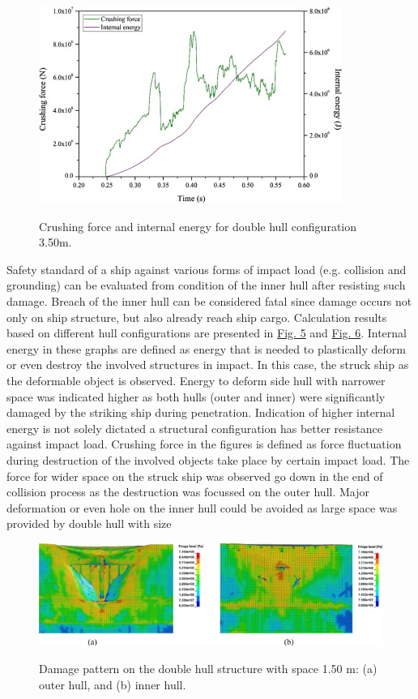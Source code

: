 \documentclass[../Final.tex]{subfiles}
\begin{document}
\begin{figure}[ht]
    \centering
    \includegraphics[width=\columnwidth]{fig6.jpg}
    \label{fig6}
    \caption{Crushing force and internal energy for double hull configuration 3.50m.}
\end{figure}

Safety standard of a ship against various forms of impact load (e.g. collision and grounding) can be evaluated from condition of the inner hull after resisting such damage. 
Breach of the inner hull can be considered fatal since damage occurs not only on ship structure, but also already reach ship cargo. Calculation results based on different hull configurations are presented in \hyperref[fig5]{Fig. 5} and \hyperref[fig6]{Fig. 6}. 
Internal energy in these graphs are defined as energy that is needed to plastically deform or even destroy the involved structures in impact. 
In this case, the struck ship as the deformable object is observed. Energy to deform side hull with narrower space was indicated higher as both hulls (outer and inner) were significantly damaged by the striking ship during penetration. 
Indication of higher internal energy is not solely dictated a structural configuration has better resistance against impact load. 
Crushing force in the figures is defined as force fluctuation during destruction of the involved objects take place by certain impact load. 
The force for wider space on the struck ship was observed go down in the end of collision process as the destruction was focussed on the outer hull. Major deformation or even hole on the inner hull could be 
avoided as large space was provided by double hull with size

\begin{figure}[ht]
    \centering
    \includegraphics[width=\columnwidth]{fig7.jpg}
    \label{fig7}
    \caption{Damage pattern on the double hull structure with space 1.50 m: (a) outer hull, and (b) inner hull.}
\end{figure}
\end{document}

